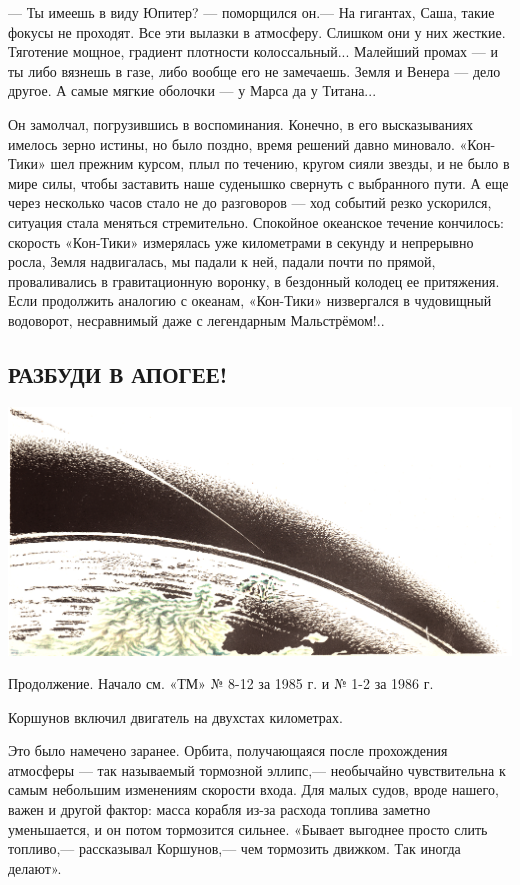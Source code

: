 \documentclass[11pt,a4paper,oneside]{article}
\begin{document}
— Ты имеешь в виду Юпитер? — поморщился он.— На гигантах, Саша, такие фокусы не проходят. Все эти вылазки в атмосферу. Слишком они у них жесткие. Тяготение мощное, градиент плотности колоссальный... Малейший промах — и ты либо вязнешь в газе, либо вообще его не замечаешь. Земля и Венера — дело другое. А самые мягкие оболочки — у Марса да у Титана...

Он замолчал, погрузившись в воспоминания. Конечно, в его высказываниях имелось зерно истины, но было поздно, время решений давно миновало. «Кон-Тики» шел прежним курсом, плыл по течению, кругом сияли звезды, и не было в мире силы, чтобы заставить наше суденышко свернуть с выбранного пути. А еще через несколько часов стало не до разговоров — ход событий резко ускорился, ситуация стала меняться стремительно. Спокойное океанское течение кончилось: скорость «Кон-Тики» измерялась уже километрами в секунду и непрерывно росла, Земля надвигалась, мы падали к ней, падали почти по прямой, проваливались в гравитационную воронку, в бездонный колодец ее притяжения. Если продолжить аналогию с океанам, «Кон-Тики» низвергался в чудовищный водоворот, несравнимый даже с легендарным Мальстрёмом!..

\subsection{РАЗБУДИ В АПОГЕЕ!}
\label{apogee}

\includegraphics[width=\textwidth]{apogee1}

Продолжение. Начало см. «ТМ» № 8-12 за 1985 г. и № 1-2 за 1986 г.

Коршунов включил двигатель на двухстах километрах.

Это было намечено заранее. Орбита, получающаяся после прохождения атмосферы — так называемый тормозной эллипс,— необычайно чувствительна к самым небольшим изменениям скорости входа. Для малых судов, вроде нашего, важен и другой фактор: масса корабля из-за расхода топлива заметно уменьшается, и он потом тормозится сильнее. «Бывает выгоднее просто слить топливо,— рассказывал	Коршунов,— чем тормозить движком. Так иногда делают».
\end{document}
